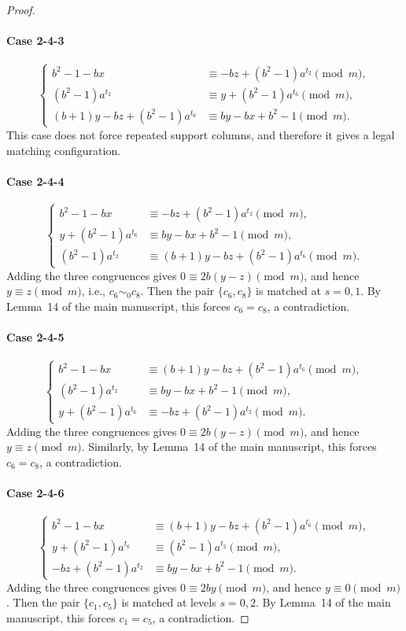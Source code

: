 \documentclass[11pt]{article}
\newcommand{\mymod}{\pmod{m}}
\begin{document}
\begin{proof}
\paragraph{Case 2-4-3}
$$
\begin{cases}
	  b^2-1-bx &\equiv-bz+(b^2-1)a^{t_2}\mymod,\\
	(b^2-1)a^{t_2} &\equiv y+(b^2-1)a^{t_6}\mymod, \\
	(b+1)y-bz+(b^2-1)a^{t_6} &\equiv by-bx+b^2-1\mymod.
\end{cases}
$$
This case does not force repeated support columns, and therefore it
gives a legal matching configuration.

\paragraph{Case 2-4-4}
$$
\begin{cases}
	b^2-1-bx &\equiv -bz+(b^2-1)a^{t_2}\mymod, \\
	y+(b^2-1)a^{t_6} &\equiv by-bx+b^2-1\mymod,  \\
	(b^2-1)a^{t_2} &\equiv (b+1)y-bz+(b^2-1)a^{t_6}\mymod.
\end{cases}
$$
Adding the three congruences gives $0\equiv2b(y-z)\mymod$, and hence
$y\equiv z\mymod$, i.e., $c_6\sim_0 c_8$. Then the pair $\{c_6,c_8\}$ is matched at $s=0,1$. By Lemma~14 of the main manuscript, this forces $c_6=c_8$, a contradiction.

\paragraph{Case 2-4-5}
$$
\begin{cases}
	b^2-1-bx &\equiv (b+1)y-bz+(b^2-1)a^{t_6}\mymod, \\
	(b^2-1)a^{t_2} &\equiv by-bx+b^2-1\mymod, \\
	y+(b^2-1)a^{t_6} &\equiv -bz+(b^2-1)a^{t_2}\mymod.
\end{cases}
$$
Adding the three congruences gives $0\equiv2b(y-z)\mymod$, and hence
$y\equiv z\mymod$. Similarly, by Lemma~14 of the main manuscript, this forces $c_6=c_8$, a
contradiction.

\paragraph{Case 2-4-6}
$$
\begin{cases}
	b^2-1-bx &\equiv (b+1)y-bz+(b^2-1)a^{t_6}\mymod, \\
	y+(b^2-1)a^{t_6} &\equiv (b^2-1)a^{t_2}\mymod, \\
	-bz+(b^2-1)a^{t_2} &\equiv by-bx+b^2-1\mymod.
\end{cases}
$$
Adding the three congruences gives $0\equiv2by\mymod$, and hence
$y\equiv0\mymod$. Then the pair $\{c_1,c_5\}$ is matched at levels $s=0,2$. By Lemma~14 of the main manuscript, this forces $c_1=c_5$, a
contradiction.


\end{proof}
\end{document}

